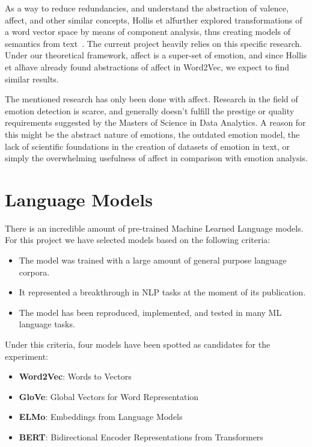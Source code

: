 As a way to reduce redundancies, and understand the abstraction of valence, affect, and other similar concepts, Hollis et al\. further explored transformations of a word vector space by means of component analysis, thus creating models of semantics from text~\cite{hollis2016principals}. The current project heavily relies on this specific research. Under our theoretical framework, affect is a super-set of emotion, and since Hollis et al\. have already found abstractions of affect in Word2Vec, we expect to find similar results.

The mentioned research has only been done with affect. Research in the field of emotion detection is scarce, and generally doesn't fulfill the prestige or quality requirements suggested by the Masters of Science in Data Analytics. A reason for this might be the abstract nature of emotions, the outdated emotion model, the lack of scientific foundations in the creation of datasets of emotion in text, or simply the overwhelming usefulness of affect in comparison with emotion analysis.


\section{Language Models}\label{sec:Language Models}
There is an incredible amount of pre-trained Machine Learned Language models. For this project we have selected models based on the following criteria:

\begin{itemize}
  \item The model was trained with a large amount of general purpose language corpora.
  \item It represented a breakthrough in NLP tasks at the moment of its publication.
  \item The model has been reproduced, implemented, and tested in many ML language tasks.
\end{itemize}

Under this criteria, four models have been spotted as candidates for the experiment:
\begin{itemize}
  \item \textbf{Word2Vec}: Words to Vectors
  \item \textbf{GloVe}: Global Vectors for Word Representation
  \item \textbf{ELMo}: Embeddings from Language Models
  \item \textbf{BERT}: Bidirectional Encoder Representations from Transformers
\end{itemize}

